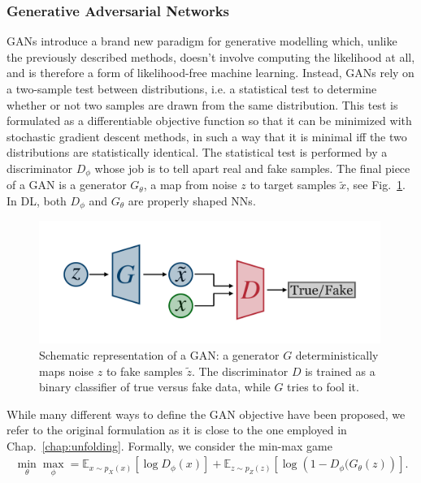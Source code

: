\subsubsection{Generative Adversarial Networks}\label{intro:gan}
GANs introduce a brand new paradigm for generative modelling which, unlike the previously described methods, doesn't involve computing the likelihood at all, and is therefore a form of likelihood-free machine learning. Instead, GANs rely on a two-sample test between distributions, i.e. a statistical test to determine whether or not two samples are drawn from the same distribution. This test is formulated as a differentiable objective function so that it can be minimized with stochastic gradient descent methods, in such a way that it is minimal iff the two distributions are statistically identical.
The statistical test is performed by a discriminator $D_{\phi}$ whose job is to tell apart real and fake samples. The final piece of a GAN is a generator $G_{\theta}$, a map from noise $z$ to target samples $\tilde{x}$, see Fig.~\ref{fig:gan}. In DL, both $D_{\phi}$ and $G_{\theta}$ are properly shaped NNs.
%
\begin{figure}[t]
\centering
\includegraphics[page = 1, width=0.99\textwidth]{./figures/gan}
\caption{Schematic representation of a GAN: a generator $G$ deterministically maps noise $z$ to fake samples $\tilde{z}$. The discriminator $D$ is trained as a binary classifier of true versus fake data, while $G$ tries to fool it.}
\label{fig:gan}
\end{figure}
%
While many different ways to define the GAN objective have been proposed, we refer to the original formulation as it is close to the one employed in Chap.~\ref{chap:unfolding}. Formally, we consider the min-max game 
%
\begin{align}
\min_{\theta} \max_{\phi} = \mathbb{E}_{x \sim p_{X}(x)} \left[ \log D_{\phi} (x) \right] + \mathbb{E}_{z\sim p_{Z}(z)} \left[ \log \left( 1 - D_{\phi} (G_{\theta}(z) \right) \right].
\end{align}
